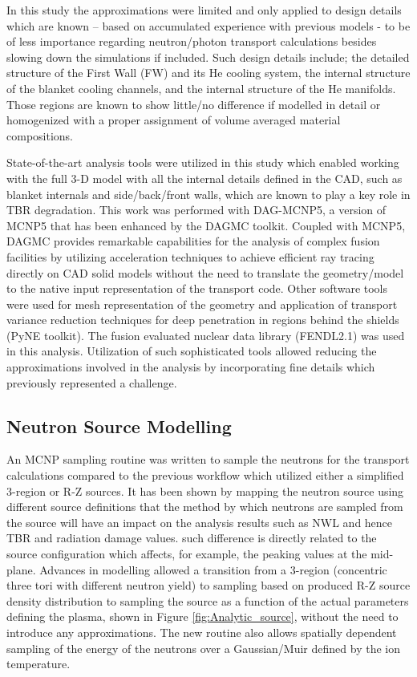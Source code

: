 \documentclass[12pt, letterpaper]{elsarticle}
\begin{document}
In this study the approximations were limited and only applied to design details which are known – based on accumulated experience with previous models - to be of less importance regarding neutron/photon transport calculations besides slowing down the simulations if included. Such design details include; the detailed structure of the First Wall (FW) and its He cooling system, the internal structure of the blanket cooling channels, and the internal structure of the He manifolds. Those regions are known to show little/no difference if modelled in detail or homogenized with a proper assignment of volume averaged material compositions.\vspace{5mm}

State-of-the-art analysis tools were utilized in this study which enabled working with the full 3-D model with all the internal details defined in the CAD, such as blanket internals and side/back/front walls, which are known to play a key role in TBR degradation. This work was performed with DAG-MCNP5, a version of MCNP5 \cite{ref_4} that has been enhanced by the DAGMC \cite{ref_5} toolkit. Coupled with MCNP5, DAGMC provides remarkable capabilities for the analysis of complex fusion facilities by utilizing acceleration techniques to achieve efficient ray tracing directly on CAD solid models without the need to translate the geometry/model to the native input representation of the transport code. Other software tools were used for mesh representation of the geometry and application of transport variance reduction techniques for deep penetration in regions behind the shields (PyNE \cite{ref_6} toolkit). The fusion evaluated nuclear data library (FENDL2.1)\cite{ref_7} was used in this analysis. Utilization of such sophisticated tools allowed reducing the approximations involved in the analysis by incorporating fine details which previously represented a challenge.\vspace{5mm}

\subsection{Neutron Source Modelling} \label{Neutron Source Modelling}
An MCNP sampling routine was written to sample the neutrons for the transport calculations compared to the previous workflow which utilized either a simplified 3-region or R-Z sources. It has been shown by mapping the neutron source using different source definitions that the method by which neutrons are sampled from the source will have an impact on the analysis results such as NWL and hence TBR and radiation damage values. such difference is directly related to the source configuration which affects, for example, the peaking values at the mid-plane. Advances in modelling allowed a transition from a 3-region (concentric three tori with different neutron yield) to sampling based on produced R-Z source density distribution to sampling the source as a function of the actual parameters defining the plasma, shown in Figure \ref{fig:Analytic_source}, without the need to introduce any approximations. The new routine also allows spatially dependent sampling of the energy of the neutrons over a Gaussian/Muir defined by the ion temperature.  
\end{document}
